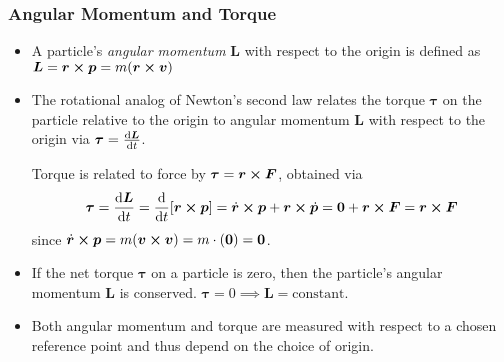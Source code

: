 \documentclass[11pt, a4paper]{article}
\begin{document}
\subsubsection{Angular Momentum and Torque}
\begin{itemize}
	\item A particle's \textit{angular momentum} $ \bm{L} $ with respect to the origin is defined as $ \bm{L} = \bm{r} \cross \bm{p} = m (\bm{r} \cross \bm{v}) $
	
	\item The rotational analog of Newton's second law relates the torque $ \bm{\tau} $ on the particle relative to the origin to angular momentum $ \bm{L} $ with respect to the origin via $ \bm{\tau} = \dv{\bm{L}}{t} $. 
	
	Torque is related to force by $ \bm{\tau} = \bm{r} \cross \bm{F} $, obtained via
	\begin{align*}
		\bm{\tau} = \dv{\bm{L}}{t} = \dv{}{t}[\bm{r} \cross \bm{p}] = \dot{\bm{r}} \cross \bm{p} + \bm{r} \cross \dot{\bm{p}} = \bm{0} + \bm{r} \cross \bm{F} =  \bm{r} \cross \bm{F}
	\end{align*}
	since $ \dot{\bm{r}} \cross \bm{p} = m (\bm{v} \cross \bm{v}) = m \cdot (\bm{0}) = \bm{0} $.
	
	\item If the net torque $ \bm{\tau} $ on a particle is zero, then the particle's angular momentum $ \bm{L} $ is conserved. $ \bm{\tau} = 0 \implies \bm{L} = \text{constant} $.
	
	\item Both angular momentum and torque are measured with respect to a chosen reference point and thus depend on the choice of origin.
	

\end{itemize}
\end{document}
